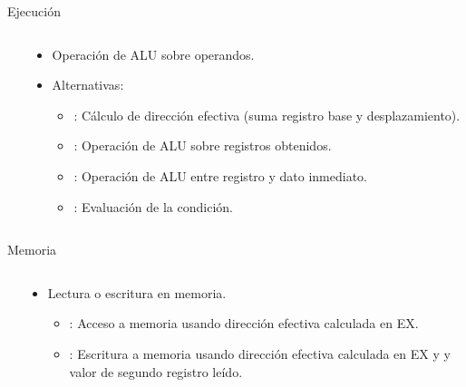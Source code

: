 \begin{frame}[t]{Ejecución}
\begin{columns}
\begin{column}{.3\textwidth}

\end{column}
\begin{column}{.7\textwidth}
\begin{itemize}
  \item Operación de ALU sobre operandos.
  \item Alternativas:
    \begin{itemize}
      \item {}:
            Cálculo de dirección efectiva (suma registro base y desplazamiento).
      \item {}:
            Operación de ALU sobre registros obtenidos.
      \item {}:
            Operación de ALU entre registro y dato inmediato.
      \item {}:
            Evaluación de la condición.
    \end{itemize}
\end{itemize}
\end{column}
\end{columns}
\end{frame}

\begin{frame}[t]{Memoria}
\begin{columns}
\begin{column}{.3\textwidth}
\begin{center}

\end{center}
\end{column}
\begin{column}{.7\textwidth}
\begin{itemize}
  \item Lectura o escritura en memoria.
    \begin{itemize}
      \item {}:
            Acceso a memoria usando dirección efectiva calculada en EX.
      \item {}:
            Escritura a memoria usando dirección efectiva calculada en EX y
            y valor de segundo registro leído.
    \end{itemize}
\end{itemize}
\end{column}
\end{columns}
\end{frame}

